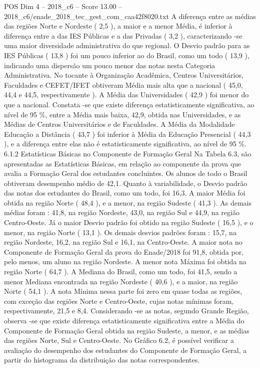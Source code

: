 \begin{textsample}{POS Dim 4 – 2018\_c6 – Score 13.00 – 2018\_c6/enade\_2018\_tec\_gest\_com\_caa42f8020.txt}
A diferença entre as médias das regiões Norte e Nordeste ( 2,5 ), a maior e a menor Média, é inferior à diferença entre a das IES Públicas e a das Privadas ( 3,2 ), caracterizando -se uma maior diversidade administrativa do que regional.
O Desvio padrão para as IES Públicas ( 13,8 ) foi um pouco inferior ao do Brasil, como um todo ( 13,9 ), indicando uma dispersão um pouco menor das notas nesta Categoria Administrativa.
No tocante à Organização Acadêmica, Centros Universitários, Faculdades e CEFET/IFET obtiveram Média mais alta que a nacional ( 45,0, 44,4 e 44,5, respectivamente ).
A Média das Universidades ( 42,9 ) foi menor do que a nacional.
Constata -se que existe diferença estatisticamente significativa, ao nível de 95 \%, entre a Média mais baixa, 42,9, obtida nas Universidades, e as Médias de Centros Universitários e de Faculdades.
A Média da Modalidade Educação a Distância ( 43,7 ) foi inferior à Média da Educação Presencial ( 44,3 ), e a diferença entre elas não é estatisticamente significativa, ao nível de 95 \%. 6.1.2 Estatísticas Básicas no Componente de Formação Geral Na Tabela 6.3, são apresentadas as Estatísticas Básicas, em relação ao componente da prova que avalia a Formação Geral dos estudantes concluintes.
Os alunos de todo o Brasil obtiveram desempenho médio de 42,1.
Quanto à variabilidade, o Desvio padrão das notas dos estudantes do Brasil, como um todo, foi 16,3.
A maior Média foi obtida na região Norte ( 48,4 ), e a menor, na região Sudeste ( 41,3 ).
As demais médias foram : 41,8, na região Nordeste, 43,0, na região Sul e 44,9, na região Centro-Oeste.
Já o maior Desvio padrão foi obtido na região Sudeste ( 16,5 ), e o menor, na região Norte ( 13,1 ).
Os demais desvios padrões foram : 15,7, na região Nordeste, 16,2, na região Sul e 16,1, na Centro-Oeste.
A maior nota no Componente de Formação Geral da prova do Enade/2018 foi 91,8, obtida por, pelo menos, um aluno na região Nordeste.
A menor nota Máxima foi obtida na região Norte ( 64,7 ).
A Mediana do Brasil, como um todo, foi 41,5, sendo a menor Mediana encontrada na região Nordeste ( 40,6 ), e a maior, na região Norte ( 54,1 ).
A nota Mínima nessa parte foi zero em quase todas as regiões, com exceção das regiões Norte e Centro-Oeste, cujas notas mínimas foram, respectivamente, 21,5 e 8,4.
Considerando -se as notas, segundo Grande Região, observa -se que existe diferença estatisticamente significativa entre a Média do Componente de Formação Geral obtida na região Sudeste, a menor, e as médias das regiões Norte, Sul e Centro-Oeste.
No Gráfico 6.2, é possível verificar a avaliação do desempenho dos estudantes do Componente de Formação Geral, a partir do histograma da distribuição das notas correspondentes.

\end{textsample}
